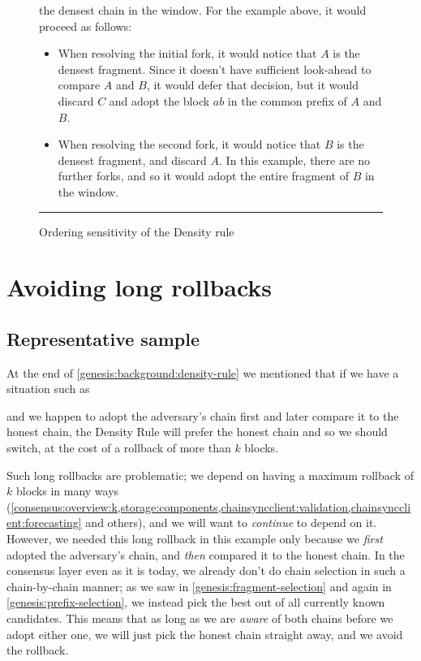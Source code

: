 \begin{figure}[p]
the densest chain in the window. For the example above, it would proceed as
follows:
%
\begin{itemize}
\item When resolving the initial fork, it would notice that $A$ is the densest
fragment. Since it doesn't have sufficient look-ahead to compare $A$ and $B$,
it would defer that decision, but it would discard $C$ and adopt the block $ab$
in the common prefix of $A$ and $B$.
\item When resolving the second fork, it would notice that $B$ is the densest
fragment, and discard $A$. In this example, there are no further forks, and
so it would adopt the entire fragment of $B$ in the window.
\end{itemize}
\hrule
\caption{\label{density-ordering-sensitivity}Ordering sensitivity of the Density rule}
\end{figure}

\section{Avoiding long rollbacks}
\label{genesis:avoiding-long-rollbacks}

\subsection{Representative sample}

At the end of \cref{genesis:background:density-rule} we mentioned that if
we have a situation such as
%
\begin{center}
\end{center}
%
and we happen to adopt the adversary's chain first and later compare it to the
honest chain, the Density Rule will prefer the honest chain and so we should
switch, at the cost of a rollback of more than $k$ blocks.

Such long rollbacks are problematic; we depend on having a maximum rollback of
$k$ blocks in many ways
(\cref{consensus:overview:k,storage:components,chainsyncclient:validation,chainsyncclient:forecasting}
and others), and we will want to \emph{continue} to depend on it. However, we
needed this long rollback in this example only because we \emph{first} adopted
the adversary's chain, and \emph{then} compared it to the honest chain. In the
consensus layer even as it is today, we already don't do chain selection in such
a chain-by-chain manner; as we saw in \cref{genesis:fragment-selection} and
again in \cref{genesis:prefix-selection}, we instead pick the best out of all
currently known candidates. This means that as long as we are \emph{aware} of
both chains before we adopt either one, we will just pick the honest chain
straight away, and we avoid the rollback.

